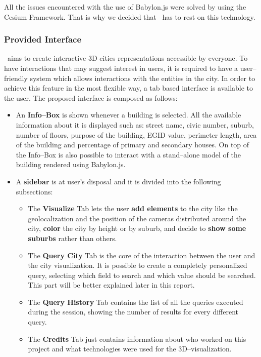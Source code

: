 All the issues encountered with the use of Babylon.js were solved by using the Cesium Framework. That is why we decided that \applicationName\ has to rest on this technology.   
\subsubsection{Provided Interface}
\applicationName\ aims to create interactive 3D cities representations accessible by everyone. To have interactions that may suggest interest in users, it is required to have a user--friendly system which allows interactions with the entities in the city. In order to achieve this feature in the most flexible way, a tab based interface is available to the user. The proposed interface is composed as follows:
\begin{itemize}
	\item An {\bf Info--Box} is shown whenever a building is selected. All the available information about it is displayed such as: street name, civic number, suburb, number of floors, purpose of the building, EGID value, perimeter length, area of the building and percentage of primary and secondary houses. On top of the Info--Box is also possible to interact with a stand--alone model of the building rendered using Babylon.js.
	\item A {\bf sidebar} is at user's disposal and it is divided into the following subsections:
	\begin{itemize}
		\item The {\bf Visualize} Tab lets the user {\bf add elements} to the city like the geolocalization and the position of the cameras distributed around the city, {\bf color} the city by height or by suburb, and decide to {\bf show some suburbs} rather than others.
		\item The {\bf Query City} Tab is the core of the interaction between the user and the city visualization. It is possible to create a completely personalized query, selecting which field to search and which value should be searched. This part will be better explained later in this report.
		\item The {\bf Query History} Tab contains the list of all the queries executed during the session, showing the number of results for every different query.
		\item The {\bf Credits} Tab just contains information about who worked on this project and what technologies were used for the 3D--visualization.
	\end{itemize}
\end{itemize}
